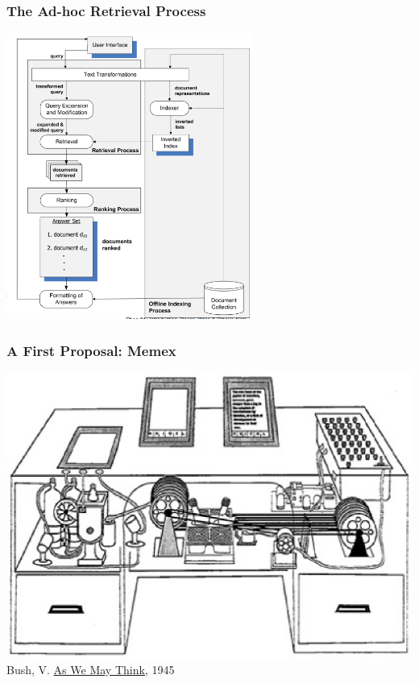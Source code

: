 \documentclass[svgnames]{beamer}
\begin{document}
\begin{frame}
    \frametitle{The Ad-hoc Retrieval Process}

    \centering
    \includegraphics[width=0.6\textwidth]{process-mir2ed-2nd}
\end{frame}

\begin{frame}
    \frametitle{A First Proposal: Memex}
    
    \begin{center}
        \includegraphics[width=.8\linewidth]{memex}\\
        \raggedleft \footnotesize Bush, V. \href{https://www.theatlantic.com/magazine/archive/1945/07/as-we-may-think/303881/}{As We May Think}, 1945
    \end{center}

\end{frame}

\end{document}
